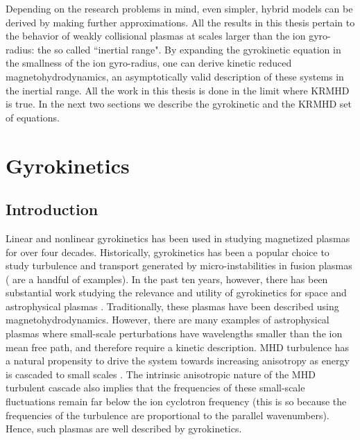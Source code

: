     Depending on the research problems in mind, even simpler, hybrid models can be derived
    by making further approximations. All the results in this thesis pertain 
    to the behavior of weakly collisional plasmas at scales larger than
    the ion gyro-radius: the so called ``inertial range". By expanding the gyrokinetic
    equation in the smallness of the ion gyro-radius, one can derive kinetic reduced
    magnetohydrodynamics, an asymptotically valid description
    of these systems in the inertial range. All the work in this thesis is done in the limit
    where KRMHD is true. In the next two sections we describe the gyrokinetic and the
    KRMHD set of equations.
    

    \section{Gyrokinetics}
    \label{eqs:sec:gk}



        \subsection{Introduction}
    Linear \cite{rutherford68, taylor68, catto78, antonsen80, catto81} and nonlinear gyrokinetics
    \cite{frieman82, dubin83, lee83, lee87, hahm88, howes06, tome, abel13} has been
    used in studying magnetized plasmas for over four decades. 
    Historically, gyrokinetics has been a popular
    choice to study turbulence and transport generated by micro-instabilities in fusion
    plasmas (\cite{dimits96, dorland00, jenko00, rogers00, jenko01, jenko01ppcf, jenko02,
    candy04, parker04} are a handful of examples). 
    In the past ten years, however, there has been substantial work studying the relevance
    and utility of gyrokinetics for space and astrophysical plasmas \cite{howes06,
    howes07, howes08pop, schekochihin08, tome, numata10, howes11prl, tenbarge12, tenbarge13, tenbarge13a,
    tenbarge14} . Traditionally, these
    plasmas have been described using magnetohydrodynamics. However,
    there are many examples of astrophysical plasmas where small-scale perturbations have
    wavelengths smaller than the ion mean free path, and therefore require a kinetic
    description. MHD turbulence has a natural propensity to drive the system towards
    increasing anisotropy as energy is cascaded to small scales \cite{galtier00,
    schekochihin12}. The intrinsic anisotropic
    nature of the MHD turbulent cascade also implies that the frequencies of these small-scale
    fluctuations remain far below the ion cyclotron frequency (this is so because the
    frequencies of the turbulence are proportional to the parallel wavenumbers). Hence, such plasmas are well
    described by gyrokinetics.

